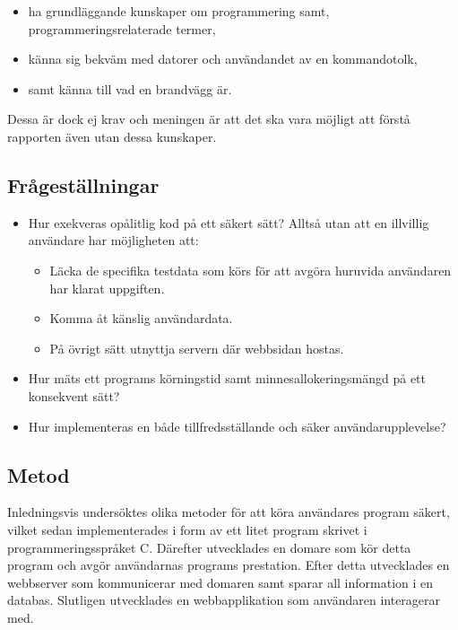 \documentclass{article}
\begin{document}
\begin{itemize}
	\item ha grundläggande kunskaper om programmering samt,
		programmeringsrelaterade termer,
	\item känna sig bekväm med datorer och användandet av en kommandotolk,
	\item samt känna till vad en brandvägg är.
\end{itemize}

Dessa är dock ej krav och meningen är att det ska vara möjligt att förstå
rapporten även utan dessa kunskaper.

\subsection{Frågeställningar}

\begin{itemize}
	\item Hur exekveras opålitlig kod på ett säkert sätt? Alltså utan att en
		illvillig användare har möjligheten att:
		\begin{itemize}
			\item Läcka de specifika testdata som körs för att avgöra huruvida
				användaren har klarat uppgiften.
			\item Komma åt känslig användardata.
			\item På övrigt sätt utnyttja servern där webbsidan hostas.
		\end{itemize}
	\item
		Hur mäts ett programs körningstid samt minnesallokeringsmängd på ett
		konsekvent sätt?
	\item
		Hur implementeras en både tillfredsställande och säker
		användarupplevelse?

\end{itemize}

\subsection{Metod}

Inledningsvis undersöktes olika metoder för att köra användares program säkert,
vilket sedan implementerades i form av ett litet program skrivet i
programmeringsspråket C. Därefter utvecklades en domare som kör detta program
och avgör användarnas programs prestation. Efter detta utvecklades en webbserver
som kommunicerar med domaren samt sparar all information i en databas. Slutligen
utvecklades en webbapplikation som användaren interagerar med.
\end{document}
